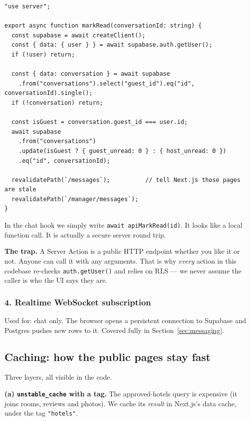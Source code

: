 \documentclass[11pt,a4paper]{article}
\begin{document}
\begin{lstlisting}[language=TS,caption={app/messages/actions.ts}]
"use server";

export async function markRead(conversationId: string) {
  const supabase = await createClient();
  const { data: { user } } = await supabase.auth.getUser();
  if (!user) return;

  const { data: conversation } = await supabase
    .from("conversations").select("guest_id").eq("id", conversationId).single();
  if (!conversation) return;

  const isGuest = conversation.guest_id === user.id;
  await supabase
    .from("conversations")
    .update(isGuest ? { guest_unread: 0 } : { host_unread: 0 })
    .eq("id", conversationId);

  revalidatePath(`/messages`);          // tell Next.js those pages are stale
  revalidatePath(`/manager/messages`);
}
\end{lstlisting}

In the chat hook we simply write \texttt{await apiMarkRead(id)}. It looks like a
local function call. It is actually a secure server round trip.

\begin{warnbox}
\textbf{The trap.} A Server Action is a public HTTP endpoint whether you like it
or not. Anyone can call it with any arguments. That is why \emph{every} action in
this codebase re-checks \texttt{auth.getUser()} and relies on RLS --- we never
assume the caller is who the UI says they are.
\end{warnbox}

\subsubsection{4. Realtime WebSocket subscription}

Used for: chat only. The browser opens a persistent connection to Supabase and
Postgres pushes new rows to it. Covered fully in Section~\ref{sec:messaging}.

\subsection{Caching: how the public pages stay fast}

Three layers, all visible in the code.

\textbf{(a) \texttt{unstable\_cache} with a tag.} The approved-hotels query is
expensive (it joins rooms, reviews and photos). We cache its \emph{result} in
Next.js's data cache, under the tag \texttt{"hotels"}.
\end{document}
